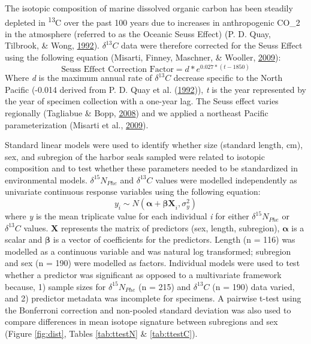 \documentclass [11pt, proquest] {uwthesis}[2015/03/03]
\begin{document}
The isotopic composition of marine dissolved organic carbon has been
steadily depleted in \textsuperscript{13}C over the past 100 years due
to increases in anthropogenic CO\_2 in the atmosphere (referred to as
the Oceanic Seuss Effect) (P. D. Quay, Tilbrook, \& Wong,
\protect\hyperlink{ref-Quay1992}{1992}). \(\delta^{13}C\) data were
therefore corrected for the Seuss Effect using the following equation
(Misarti, Finney, Maschner, \& Wooller,
\protect\hyperlink{ref-Misarti2009}{2009}):
\begin{equation} 
 \mbox {Seuss Effect Correction Factor} =   
  d * e^{0.027*(t-1850)}
  \label{eq:seuss}
\end{equation}
Where \emph{d} is the maximum annual rate of \(\delta^{13}C\) decrease
specific to the North Pacific (-0.014 derived from P. D. Quay et al.
(\protect\hyperlink{ref-Quay1992}{1992})), \emph{t} is the year
represented by the year of specimen collection with a one-year lag. The
Seuss effect varies regionally (Tagliabue \& Bopp,
\protect\hyperlink{ref-Tagliabue2008}{2008}) and we applied a northeast
Pacific parameterization (Misarti et al.,
\protect\hyperlink{ref-Misarti2009}{2009}).

Standard linear models were used to identify whether size (standard
length, cm), sex, and subregion of the harbor seals sampled were related
to isotopic composition and to test whether these parameters needed to
be standardized in environmental models. \(\delta^{15}N_{Phe}\) and
\(\delta^{13}C\) values were modelled independently as univariate
continuous response variables using the following equation:
\begin{equation} 
 y_i \sim N(\boldsymbol{\alpha} + \boldsymbol{\beta X}_i, \sigma^2_y)
  \label{eq:linmods}
\end{equation}
where \emph{y} is the mean triplicate value for each individual \emph{i}
for either \(\delta^{15}N_{Phe}\) or \(\delta^{13}C\) values. \textbf{X}
represents the matrix of predictors (sex, length, subregion),
\(\boldsymbol{\alpha}\) is a scalar and \(\boldsymbol{\beta}\) is a
vector of coefficients for the predictors. Length (n = 116) was modelled
as a continuous variable and was natural log transformed; subregion and
sex (n = 190) were modelled as factors. Individual models were used to
test whether a predictor was significant as opposed to a multivariate
framework because, 1) sample sizes for \(\delta^{15}N_{Phe}\) (n = 215)
and \(\delta^{13}C\) (n = 190) data varied, and 2) predictor metadata
was incomplete for specimens. A pairwise t-test using the Bonferroni
correction and non-pooled standard deviation was also used to compare
differences in mean isotope signature between subregions and sex (Figure
\ref{fig:dist}, Tables \ref{tab:ttestN} \& \ref{tab:ttestC}).
\end{document}
